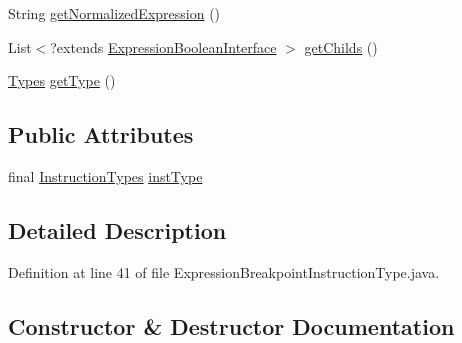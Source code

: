 \begin{DoxyCompactItemize}
String \hyperlink{classgov_1_1nasa_1_1jpf_1_1inspector_1_1server_1_1expression_1_1expressions_1_1_expression_breakpoint_instruction_type_a16d0e75d847e9d4e5b4b0cb7c811d0e2}{get\+Normalized\+Expression} ()
\item 
List$<$?extends \hyperlink{interfacegov_1_1nasa_1_1jpf_1_1inspector_1_1server_1_1expression_1_1_expression_boolean_interface}{Expression\+Boolean\+Interface} $>$ \hyperlink{classgov_1_1nasa_1_1jpf_1_1inspector_1_1server_1_1expression_1_1_expression_boolean_leaf_aa99bf3cf13bd8cc1d6c33208bc83b185}{get\+Childs} ()
\item 
\hyperlink{enumgov_1_1nasa_1_1jpf_1_1inspector_1_1server_1_1expression_1_1_types}{Types} \hyperlink{classgov_1_1nasa_1_1jpf_1_1inspector_1_1server_1_1expression_1_1_expression_boolean_aed010ff8683eb1e8621e226703133457}{get\+Type} ()
\end{DoxyCompactItemize}
\subsection*{Public Attributes}
\begin{DoxyCompactItemize}
\item 
final \hyperlink{enumgov_1_1nasa_1_1jpf_1_1inspector_1_1interfaces_1_1_instruction_types}{Instruction\+Types} \hyperlink{classgov_1_1nasa_1_1jpf_1_1inspector_1_1server_1_1expression_1_1expressions_1_1_expression_breakpoint_instruction_type_a7343e1115cf9f4681a33d86bd05721c4}{inst\+Type}
\end{DoxyCompactItemize}


\subsection{Detailed Description}


Definition at line 41 of file Expression\+Breakpoint\+Instruction\+Type.\+java.



\subsection{Constructor \& Destructor Documentation}
